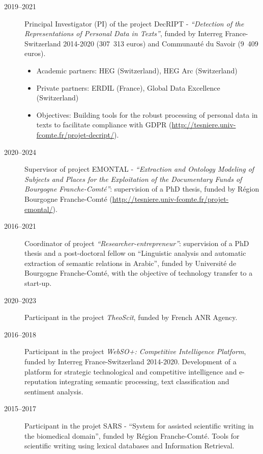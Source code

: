 \documentclass[11pt,a4paper,roman]{moderncv}
\begin{document}
\begin{description}
\item[2019--2021] Principal Investigator (PI) of the project DecRIPT - \textit{“Detection of the Representations of Personal Data in Texts”}, funded by Interreg France-Switzerland 2014-2020 (307~313 euros) and Communauté du Savoir (9~409 euros).
\begin{itemize}
\item Academic partners: HEG (Switzerland), HEG Arc (Switzerland)
\item Private partners: ERDIL (France), Global Data Excellence (Switzerland)
\item Objectives: Building tools for the robust processing of personal data in texts to facilitate compliance with GDPR (\url{http://tesniere.univ-fcomte.fr/projet-decript/}).
\end{itemize}

\item[2020--2024] Supervisor of project EMONTAL - \textit{“Extraction and Ontology Modeling of Subjects and Places for the Exploitation of the Documentary Funds of Bourgogne Franche-Comté”}: supervision of a PhD thesis, funded by Région Bourgogne Franche-Comté (\url{http://tesniere.univ-fcomte.fr/projet-emontal/}).

\item[2016--2021] Coordinator of project \textit{“Researcher-entrepreneur”}: supervision of a PhD thesis and a post-doctoral fellow on “Linguistic analysis and automatic extraction of semantic relations in Arabic”, funded by Université de Bourgogne Franche-Comté, with the objective of technology transfer to a start-up.

\item[2020--2023] Participant in the project \textit{TheoScit}, funded by French ANR Agency.

\item[2016--2018] Participant in the project \textit{WebSO+: Competitive Intelligence Platform}, funded by Interreg France-Switzerland 2014-2020. Development of a platform for strategic technological and competitive intelligence and e-reputation integrating semantic processing, text classification and sentiment analysis.

\item[2015--2017] Participant in the projet SARS - “System for assisted scientific writing in the biomedical domain”, funded by Région Franche-Comté. Tools for scientific writing using lexical databases and Information Retrieval.




\end{description}
\end{document}

